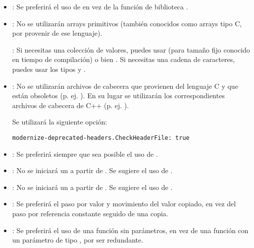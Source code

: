 \begin{itemize}

\item {}:
Se preferirá el uso de  en vez de la función
de biblioteca .

\item {}:
No se utilizarán arrays primitivos (también conocidos como arrays tipo C, por
provenir de ese lenguaje).

: Si necesitas una colección de valores, puedes usar
 (para tamaño fijo conocido en tiempo de compilación) o bien
. Si necesitas una cadena de caracteres, puedes usar los
tipos  y .

\item {}:
No se utilizarán archivos de cabecera que provienen del lenguaje C y que están
obsoletos (p. ej. ). En su lugar se utilizarán los
correspondientes archivos de cabecera de C++ (p. ej. ).

Se utilizará la siguiente opción:

\begin{lstlisting}
modernize-deprecated-headers.CheckHeaderFile: true
\end{lstlisting}

\item {}:
Se preferirá siempre que sea posible el uso de .

\item {}:
No se iniciará un  a partir de .
Se sugiere el uso de .

\item {}:
No se iniciará un  a partir de .
Se sugiere el uso de .

\item {}:
Se preferirá el paso por valor y movimiento del valor copiado, en vez del paso
por referencia constante seguido de una copia.

\item {}:
Se preferirá el uso de una función sin parámetros, en vez de una función con un
parámetro de tipo , por ser redundante.


\end{itemize}
